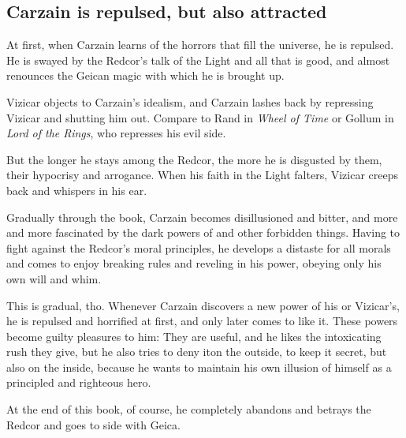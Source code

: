 








\subsection{Carzain is repulsed, but also attracted}
At first, when Carzain learns of the horrors that fill the universe, he is repulsed. He is swayed by the Redcor's talk of the Light and all that is good, and almost renounces the  Geican magic with which he is brought up. 

Vizicar objects to Carzain's idealism, and Carzain lashes back by repressing Vizicar and shutting him out. Compare to Rand in \emph{Wheel of Time} or Gollum in \emph{Lord of the Rings}, who represses his evil side. 

But the longer he stays among the Redcor, the more he is disgusted by them, their hypocrisy and arrogance. When his faith in the Light falters, Vizicar creeps back and whispers in his ear. 

Gradually through the book, Carzain becomes disillusioned and bitter, and more and more fascinated by the dark powers of \nieur{} and other forbidden things. Having to fight against the Redcor's moral principles, he develops a distaste for all morals and comes to enjoy breaking rules and reveling in his power, obeying only his own will and whim. 

This is gradual, tho. Whenever Carzain discovers a new power of his or Vizicar's, he is repulsed and horrified at first, and only later comes to like it. These powers become guilty pleasures to him: They are useful, and he likes the intoxicating rush they give, but he also tries to deny it\dash on the outside, to keep it secret, but also on the inside, because he wants to maintain his own illusion of himself as a principled and righteous hero. 

At the end of this book, of course, he completely abandons and betrays the Redcor and goes to side with Geica. 









